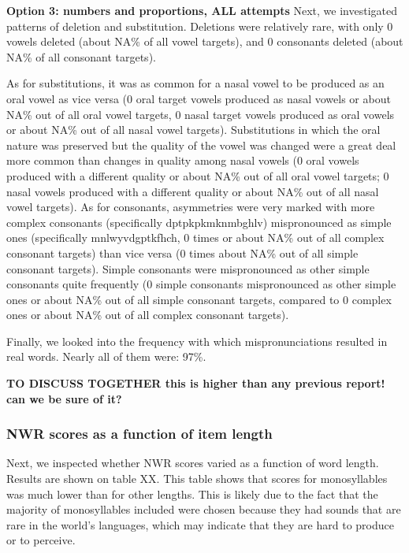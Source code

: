 \documentclass[english,,man,floatsintext]{apa6}
\begin{document}
\textbf{Option 3: numbers and proportions, ALL attempts} Next, we
investigated patterns of deletion and substitution. Deletions were
relatively rare, with only 0 vowels deleted (about NA\% of all vowel
targets), and 0 consonants deleted (about NA\% of all consonant
targets).

As for substitutions, it was as common for a nasal vowel to be produced
as an oral vowel as vice versa (0 oral target vowels produced as nasal
vowels or about NA\% out of all oral vowel targets, 0 nasal target
vowels produced as oral vowels or about NA\% out of all nasal vowel
targets). Substitutions in which the oral nature was preserved but the
quality of the vowel was changed were a great deal more common than
changes in quality among nasal vowels (0 oral vowels produced with a
different quality or about NA\% out of all oral vowel targets; 0 nasal
vowels produced with a different quality or about NA\% out of all nasal
vowel targets). As for consonants, asymmetries were very marked with
more complex consonants (specifically dptpkpkmknmbghlv) mispronounced as
simple ones (specifically mnlwyvdgptkfhch, 0 times or about NA\% out of
all complex consonant targets) than vice versa (0 times about NA\% out
of all simple consonant targets). Simple consonants were mispronounced
as other simple consonants quite frequently (0 simple consonants
mispronounced as other simple ones or about NA\% out of all simple
consonant targets, compared to 0 complex ones or about NA\% out of all
complex consonant targets).

Finally, we looked into the frequency with which mispronunciations
resulted in real words. Nearly all of them were: 97\%.

\textbf{TO DISCUSS TOGETHER this is higher than any previous report! can
we be sure of it?}

\subsubsection{NWR scores as a function of item
length}\label{nwr-scores-as-a-function-of-item-length}

Next, we inspected whether NWR scores varied as a function of word
length. Results are shown on table XX. This table shows that scores for
monosyllables was much lower than for other lengths. This is likely due
to the fact that the majority of monosyllables included were chosen
because they had sounds that are rare in the world's languages, which
may indicate that they are hard to produce or to perceive.
\end{document}
